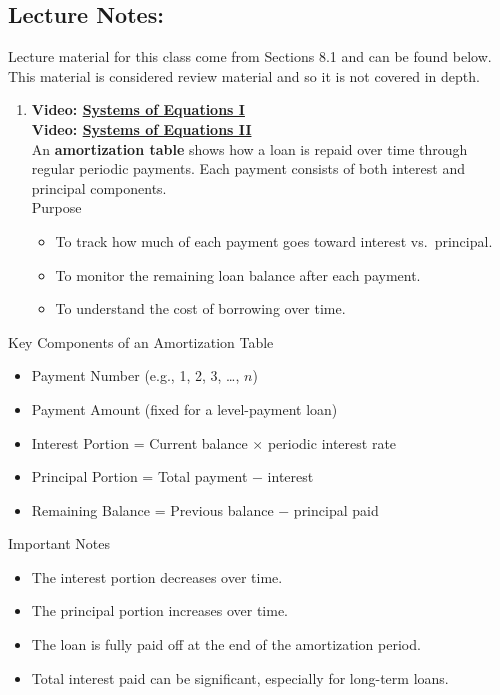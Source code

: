 \documentclass[
]{book}
\providecommand{\tightlist}{%
  \setlength{\itemsep}{0pt}\setlength{\parskip}{0pt}}
\begin{document}
\subsection*{Lecture Notes:}\label{lecture-notes-15}

Lecture material for this class come from Sections 8.1 and can be found below. This material is considered review material and so it is not covered in depth.

\begin{enumerate}
\def\labelenumi{\arabic{enumi}.}
\setcounter{enumi}{4}
\tightlist
\item
  \textbf{Video: \href{https://youtu.be/vdxdyhyXa8Q}{Systems of Equations I}}\\
  \textbf{Video: \href{https://youtu.be/tZpRI_6_Og0}{Systems of Equations II}}\\
  An \textbf{amortization table} shows how a loan is repaid over time through regular periodic payments. Each payment consists of both interest and principal components.\\
  Purpose

  \begin{itemize}
  \tightlist
  \item
    To track how much of each payment goes toward interest vs.~principal.
  \item
    To monitor the remaining loan balance after each payment.
  \item
    To understand the cost of borrowing over time.
  \end{itemize}
\end{enumerate}

Key Components of an Amortization Table

\begin{itemize}
\tightlist
\item
  Payment Number (e.g., 1, 2, 3, \ldots, \(n\))
\item
  Payment Amount (fixed for a level-payment loan)
\item
  Interest Portion = Current balance \(\times\) periodic interest rate
\item
  Principal Portion = Total payment \(-\) interest
\item
  Remaining Balance = Previous balance \(-\) principal paid
\end{itemize}

Important Notes

\begin{itemize}
\tightlist
\item
  The interest portion decreases over time.
\item
  The principal portion increases over time.
\item
  The loan is fully paid off at the end of the amortization period.
\item
  Total interest paid can be significant, especially for long-term loans.
\end{itemize}
\end{document}
